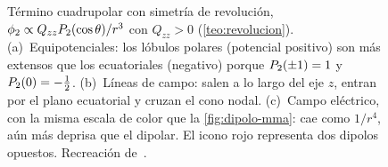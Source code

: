 \begin{figure}[t]
\begin{minipage}[t]{0.325\textwidth}
\end{minipage}
\caption{Término cuadrupolar con simetría de revolución, $\phi_{2}\propto Q_{zz}P_{2}(\cos\theta)/r^{3}$ con $Q_{zz}>0$ (\cref{teo:revolucion}). (a)~Equipotenciales: los
lóbulos polares (potencial positivo) son más extensos que los ecuatoriales (negativo) porque $P_{2}(\pm1)=1$ y $P_{2}(0)=-\frac12$. (b)~Líneas de campo: salen a lo largo
del eje $z$, entran por el plano ecuatorial y cruzan el cono nodal. (c)~Campo eléctrico, con la misma escala de color que la \cref{fig:dipolo-mma}: cae como $1/r^{4}$,
aún más deprisa que el dipolar. El icono rojo representa dos dipolos opuestos. Recreación de~\cite{FIGURAS-T2}.}
\label{fig:cuadrupolo-mma}
\end{figure}
